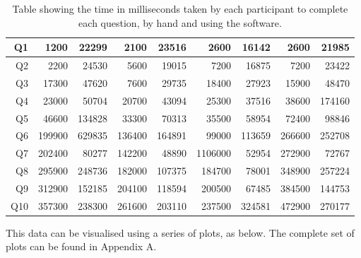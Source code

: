 \documentclass[12pt,twoside,notitlepage,xetex]{report}
\begin{document}
\begin{center}
\begin{table}[H]
\begin{center}
\begin{tabular}{|r||r|r||r|r||r|r||r|r|}
Q1 & 1200 & 22299 & 2100 & 23516 & 2600 & 16142 & 2600 & 21985\\ \hline
Q2 & 2200 & 24530 & 5600 & 19015 & 7200 & 16875 & 7200 & 23422\\ \hline
Q3 & 17300 & 47620 & 7600 & 29735 & 18400 & 27923 & 15900 & 48470\\ \hline
Q4 & 23000 & 50704 & 20700 & 43094 & 25300 & 37516 & 38600 & 174160\\ \hline
Q5 & 46600 & 134828 & 33300 & 70313 & 35500 & 58954 & 72400 & 98846\\ \hline
Q6 & 199900 & 629835 & 136400 & 164891 & 99000 & 113659 & 266600 & 252708\\ \hline
Q7 & 202400 & 80277 & 142200 & 48890 & 1106000 & 52954 & 272900 & 72767\\ \hline
Q8 & 295900 & 248736 & 182000 & 107375 & 184700 & 78001 & 348900 & 257224\\ \hline
Q9 & 312900 & 152185 & 204100 & 118594 & 200500 & 67485 & 384500 & 144753\\ \hline
Q10 & 357300 & 238300 & 261600 & 203110 & 237500 & 324581 & 472900 & 270177\\
\hline
\end{tabular}
\end{center}
\caption{Table showing the time in milliseconds taken by each participant to complete each question, by hand and using the software.}
\end{table}
\end{center}

This data can be visualised using a series of plots, as below.  The complete set of plots can be found in Appendix A.
\end{document}
